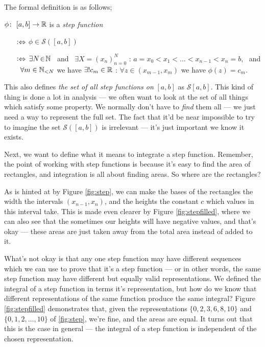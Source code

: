 The formal definition is as follows;
\begin{definition}
    $\phi\colon \ [a, b] \rightarrow \mathbb{R}$ is a {\em step function}
    \begin{itemize}
        \item[$\mathrel{\vcentcolon\Leftrightarrow}$]
            $\phi \in \mathcal{S}([a, b])$
        \item[$\mathrel{\vcentcolon\Leftrightarrow}$]
            $\exists N \! \in \! \mathbb{N}$ \ and \ $\exists X = (x_n)_{n=0}^N$ : $a = x_0 < x_1 < \ldots < x_{n-1} < x_n = b$, \ and \ $\forall m\in\mathbb{N}_{< N}$ we have $\exists! c_m \in \mathbb{R}$ : $\forall z \in (x_{m-1}, x_{m})$ we have $\phi(z) = c_m$.
    \end{itemize}
\end{definition}

This also defines \emph{the set of all step functions on} $[a, b]$ as $\mathcal{S}[a, b]$. This kind of thing is done a lot in analysis --- we often want to look at the set of all things which satisfy some property. We normally don't have to \emph{find} them all --- we just need a way to represent the full set. The fact that it'd be near impossible to try to imagine the set $\mathcal{S}([a, b])$ is irrelevant --- it's just important we know it exists.

\medskip
Next, we want to define what it means to integrate a step function. Remember, the point of working with step functions is because it's easy to find the area of rectangles, and integration is all about finding areas. So where are the rectangles? 

\medskip
As is hinted at by Figure \ref{fig:step}, we can make the bases of the rectangles the width the intervals $(x_{n-1}, x_n)$, and the heights the constant $c$ which values in this interval take. This is made even clearer by Figure \ref{fig:stepfilled}, where we can also see that the sometimes our heights will have negative values, and that's okay --- these areas are just taken away from the total area instead of added to it.
 
What's not okay is that any one step function may have different sequences which we can use to prove that it's a step function --- or in other words, the same step function may have different but equally valid representations. We defined the integral of a step function in terms it's representation, but how do we know that different representations of the same function produce the same integral? Figure \ref{fig:stepfilled} demonstrates that, given the representations $\{0, 2, 3, 6, 8, 10\}$ and $\{0, 1, 2, \ldots, 10\}$ of \ref{fig:step}, we're fine, and the areas are equal. It turns out that this is the case in general --- the integral of a step function is independent of the chosen representation.

